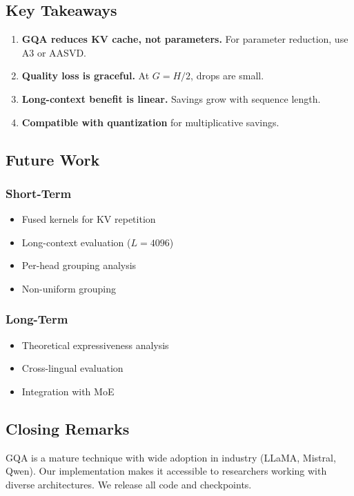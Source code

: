 \subsection{Key Takeaways}

\begin{enumerate}
\item \textbf{GQA reduces KV cache, not parameters.} For parameter reduction, use
  A3 or AASVD.
\item \textbf{Quality loss is graceful.} At $G = H/2$, drops are small.
\item \textbf{Long-context benefit is linear.} Savings grow with sequence length.
\item \textbf{Compatible with quantization} for multiplicative savings.

\end{enumerate}
\subsection{Future Work}

\subsubsection{Short-Term}
\begin{itemize}
\item Fused kernels for KV repetition
\item Long-context evaluation ($L = 4096$)
\item Per-head grouping analysis
\item Non-uniform grouping

\end{itemize}
\subsubsection{Long-Term}
\begin{itemize}
\item Theoretical expressiveness analysis
\item Cross-lingual evaluation
\item Integration with MoE

\end{itemize}
\subsection{Closing Remarks}

GQA is a mature technique with wide adoption in industry (LLaMA, Mistral, 
Qwen). Our implementation makes it accessible to researchers working with 
diverse architectures. We release all code and checkpoints.

